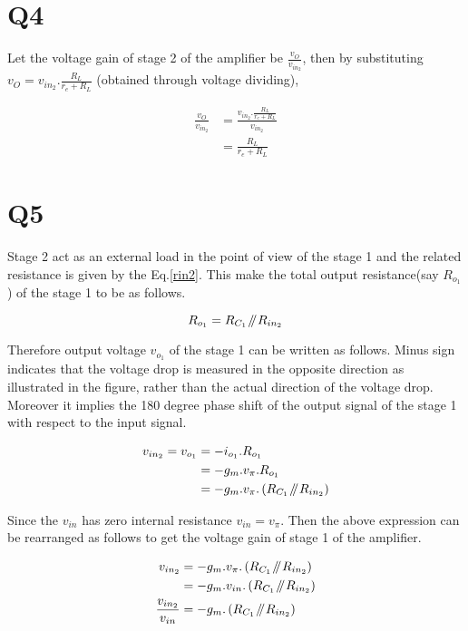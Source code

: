 \documentclass[a4paper,11pt]{article}%
\newcommand{\parallelsum}{\mathbin{\!/\mkern-5mu/\!}}
\begin{document}
\section*{Q4}
Let the voltage gain of stage 2 of the amplifier be $\frac{v_O}{v_{in_2}}$, then by substituting $v_O = v_{in_2}.\frac{R_L}{r_e+R_L}$ (obtained through voltage dividing),

\begin{equation}
	\begin{split}
		\frac{v_O}{v_{in_2}} &= \frac{v_{in_2}.\frac{R_L}{r_e+R_L}}{v_{in_2}}\\
		&=\frac{R_L}{r_e+R_L}
	\end{split}
\label{q4}
\end{equation}


\section*{Q5}
Stage 2 act as an external load in the point of view of the stage 1 and the related resistance is given by the Eq.\eqref{rin2}. This make the total output resistance(say $R_{o_1}$) of the stage 1 to be as follows.

\[
R_{o_1} = R_{C_1} \parallelsum R_{in_2}
\]


Therefore output voltage $v_{o_1}$ of the stage 1 can be written as follows. Minus sign indicates that the voltage drop is measured in the opposite direction as illustrated in the figure, rather than the actual direction of the voltage drop. Moreover it implies the 180 degree phase shift of the output signal of the stage 1 with respect to the input signal.

\[
\begin{split}
v_{in_2} = v_{o_1} &= -i_{o_1}.R_{o_1} \\
& = -g_m.v_{\pi}.R_{o_1}\\
&= -g_m.v_{\pi}.\left( R_{C_1} \parallelsum R_{in_2} \right)\\	
\end{split}
\]



Since the $v_{in}$ has zero internal resistance  $v_{in} = v_{\pi}$. Then the above expression can be rearranged as follows to get the voltage gain of stage 1 of the amplifier.


\begin{equation}
	\begin{split}
		v_{in_2} &= -g_m.v_{\pi}.\left( R_{C_1} \parallelsum R_{in_2} \right)\\
		&= -g_m.v_{in}.\left( R_{C_1} \parallelsum R_{in_2} \right)\\
		\frac{v_{in_2}}{v_{in}} & = -g_m.\left( R_{C_1} \parallelsum R_{in_2} \right)
	\end{split}
\label{q5}
\end{equation}
\end{document}
